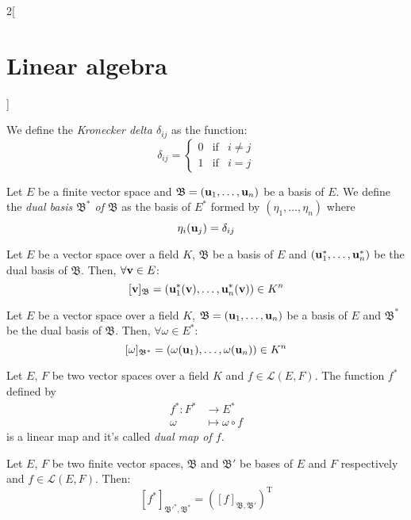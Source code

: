 \documentclass[../../../main.tex]{subfiles}
\begin{document}
\begin{multicols}{2}[\section{Linear algebra}]
\begin{definition}
    We define the \textit{Kronecker delta $\delta_{ij}$} as the function: $$\delta_{ij}=\left\{
    \begin{array}{ccc}
        0 & \text{if} & i\ne j\\
        1 & \text{if} & i=j
    \end{array}
    \right.$$
\end{definition}
\begin{definition}
    Let $E$ be a finite vector space and $\mathfrak{B}=(\vb{u}_1,\ldots,\vb{u}_n)$ be a basis of $E$. We define the \textit{dual basis $\mathfrak{B}^*$ of $\mathfrak{B}$} as the basis of $E^*$ formed by $(\eta_1,\ldots,\eta_n)$ where $$\eta_i(\vb{u}_j)=\delta_{ij}$$
\end{definition}
\begin{lemma}
    Let $E$ be a vector space over a field $K$, $\mathfrak{B}$ be a basis of $E$ and $(\vb{u}_1^*,\ldots,\vb{u}_n^*)$ be the dual basis of $\mathfrak{B}$. Then, $\forall \vb{v}\in E$: $$[\vb{v}]_\mathfrak{B}=(\vb{u}_1^*(\vb{v}),\ldots,\vb{u}_n^*(\vb{v}))\in K^n$$
\end{lemma}
\begin{lemma}
    Let $E$ be a vector space over a field $K$, $\mathfrak{B}=(\vb{u}_1,\ldots,\vb{u}_n)$ be a basis of $E$ and $\mathfrak{B}^*$ be the dual basis of $\mathfrak{B}$. Then, $\forall \omega\in E^*$: $$[\omega]_{\mathfrak{B}^*}=(\omega(\vb{u}_1),\ldots,\omega(\vb{u}_n))\in K^n$$
\end{lemma}
\begin{definition}
    Let $E$, $F$ be two vector spaces over a field $K$ and $f\in \mathcal{L}(E,F)$. The function $f^*$ defined by
    \begin{align*}
        f^*:F^*&\longrightarrow E^*\\
        \omega &\longmapsto\omega\circ f
    \end{align*}
    is a linear map and it's called \textit{dual map of $f$}.
\end{definition}
\begin{theorem}
    Let $E$, $F$ be two finite vector spaces, $\mathfrak{B}$ and $\mathfrak{B}'$ be bases of $E$ and $F$ respectively and $f\in\mathcal{L}(E,F)$. Then: $$[f^*]_{\mathfrak{B}'^*,\mathfrak{B}^*}={([f]_{\mathfrak{B},\mathfrak{B}'})}^\mathrm{T}$$
\end{theorem}

\end{multicols}
\end{document}
